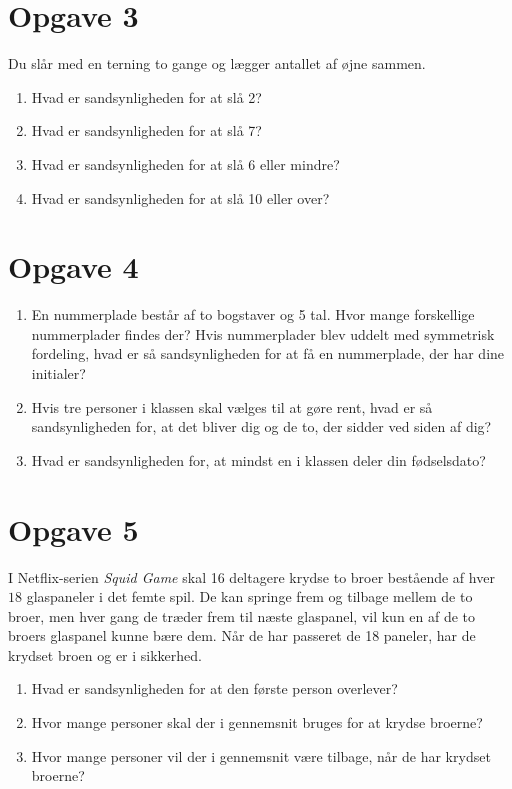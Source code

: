 \section*{Opgave 3}
Du slår med en terning to gange og lægger antallet af øjne sammen. 
\begin{enumerate}[label=\roman*)]
	\item Hvad er sandsynligheden for at slå 2?
	\item Hvad er sandsynligheden for at slå 7?
	\item Hvad er sandsynligheden for at slå 6 eller mindre?
	\item Hvad er sandsynligheden for at slå 10 eller over?
\end{enumerate}

\section*{Opgave 4}
\begin{enumerate}[label=\roman*)]
\item En nummerplade består af to bogstaver og 5 tal. Hvor mange forskellige nummerplader findes der? Hvis nummerplader blev uddelt med symmetrisk fordeling, hvad er så sandsynligheden for at få en nummerplade, der har dine initialer?
\item Hvis tre personer i klassen skal vælges til at gøre rent, hvad er så sandsynligheden for, at det bliver dig og de to, der sidder ved siden af dig?
\item Hvad er sandsynligheden for, at mindst en i klassen deler din fødselsdato?
\end{enumerate}
\section*{Opgave 5}
I Netflix-serien \textit{Squid Game} skal 16 deltagere krydse to broer bestående af hver $18$ glaspaneler i det femte spil. De kan springe frem og tilbage mellem de to broer, men hver gang de træder frem til næste glaspanel, vil kun en af de to broers glaspanel kunne bære dem. Når de har passeret de 18 paneler, har de krydset broen og er i sikkerhed.
\begin{enumerate}[label=\roman*)]
\item Hvad er sandsynligheden for at den første person overlever?
\item Hvor mange personer skal der i gennemsnit bruges for at krydse broerne? 
\item Hvor mange personer vil der i gennemsnit være tilbage, når de har krydset broerne?
\end{enumerate}

